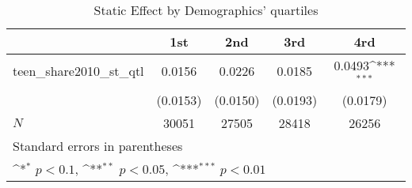 \begin{table}[htbp]\centering
\def\sym#1{\ifmmode^{#1}\else\(^{#1}\)\fi}
\caption{Static Effect by Demographics' quartiles}
\begin{tabular}{l*{4}{c}}
\hline\hline
            &\multicolumn{1}{c}{1st}&\multicolumn{1}{c}{2nd}&\multicolumn{1}{c}{3rd}&\multicolumn{1}{c}{4rd}\\
\hline
teen\_share2010\_st\_qtl&      0.0156         &      0.0226         &      0.0185         &      0.0493\sym{***}\\
            &    (0.0153)         &    (0.0150)         &    (0.0193)         &    (0.0179)         \\
\hline
\(N\)       &       30051         &       27505         &       28418         &       26256         \\
\hline\hline
\multicolumn{5}{l}{\footnotesize Standard errors in parentheses}\\
\multicolumn{5}{l}{\footnotesize \sym{*} \(p<0.1\), \sym{**} \(p<0.05\), \sym{***} \(p<0.01\)}\\
\end{tabular}
\end{table}
